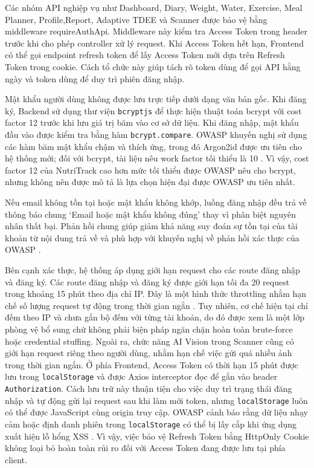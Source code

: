\documentclass[12pt, a4paper]{report}
\begin{document}
Các nhóm API nghiệp vụ như Dashboard, Diary, Weight, Water, Exercise, Meal Planner, Profile,Report, Adaptive TDEE và Scanner được bảo vệ bằng middleware requireAuthApi. Middleware này kiểm tra Access Token trong header trước khi cho phép controller xử lý request. Khi Access Token hết hạn, Frontend có thể gọi endpoint refresh token để lấy Access Token mới dựa trên Refresh Token trong cookie. Cách tổ chức này giúp tách rõ token dùng để gọi API hằng ngày và token dùng để duy trì phiên đăng nhập.

Mật khẩu người dùng không được lưu trực tiếp dưới dạng văn bản gốc. Khi đăng ký, Backend sử dụng thư viện \texttt{bcryptjs} để thực hiện thuật toán bcrypt với cost factor 12 trước khi lưu giá trị băm vào cơ sở dữ liệu. Khi đăng nhập, mật khẩu đầu vào được kiểm tra bằng hàm \texttt{bcrypt.compare}. OWASP khuyến nghị sử dụng các hàm băm mật khẩu chậm và thích ứng, trong đó Argon2id được ưu tiên cho hệ thống mới; đối với bcrypt, tài liệu nêu work factor tối thiểu là 10 \cite{owaspPasswordStorage}. Vì vậy, cost factor 12 của NutriTrack cao hơn mức tối thiểu được OWASP nêu cho bcrypt, nhưng không nên được mô tả là lựa chọn hiện đại được OWASP ưu tiên nhất.

Nếu email không tồn tại hoặc mật khẩu không khớp, luồng đăng nhập đều trả về thông báo chung ‘Email hoặc mật khẩu không đúng’ thay vì phân biệt nguyên nhân thất bại. Phản hồi chung giúp giảm khả năng suy đoán sự tồn tại của tài khoản từ nội dung trả về và phù hợp với khuyến nghị về phản hồi xác thực của OWASP \cite{owaspAuthentication}.

Bên cạnh xác thực, hệ thống áp dụng giới hạn request cho các route đăng nhập và đăng ký. Các route đăng nhập và đăng ký được giới hạn tối đa 20 request trong khoảng 15 phút theo địa chỉ IP. Đây là một hình thức throttling nhằm hạn chế số lượng request tự động trong thời gian ngắn \cite{owaspAuthentication}. Tuy nhiên, cơ chế hiện tại chỉ đếm theo IP và chưa gắn bộ đếm với từng tài khoản, do đó được xem là một lớp phòng vệ bổ sung chứ không phải biện pháp ngăn chặn hoàn toàn brute-force hoặc credential stuffing. Ngoài ra, chức năng AI Vision trong Scanner cũng có giới hạn request riêng theo người dùng, nhằm hạn chế việc gửi quá nhiều ảnh trong thời gian ngắn. Ở phía Frontend, Access Token có thời hạn 15 phút được lưu trong \texttt{localStorage} và được Axios interceptor đọc để gắn vào header \texttt{Authorization}. Cách lưu trữ này thuận tiện cho việc duy trì trạng thái đăng nhập và tự động gửi lại request sau khi làm mới token, nhưng \texttt{localStorage} luôn có thể được JavaScript cùng origin truy cập. OWASP cảnh báo rằng dữ liệu nhạy cảm hoặc định danh phiên trong \texttt{localStorage} có thể bị lấy cắp khi ứng dụng xuất hiện lỗ hổng XSS \cite{owaspHTML5Security}. Vì vậy, việc bảo vệ Refresh Token bằng HttpOnly Cookie không loại bỏ hoàn toàn rủi ro đối với Access Token đang được lưu tại phía client.
\end{document}

